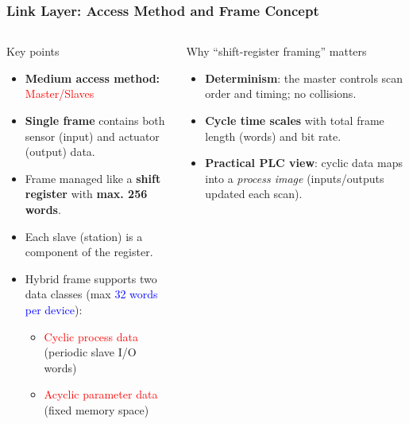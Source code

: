 \begin{frame}
	\frametitle{Link Layer: Access Method and Frame Concept}
	\small
	\begin{columns}
			\begin{block}{Key points}
				\begin{itemize}
					\item \textbf{Medium access method:} \textcolor{red}{Master/Slaves}
					\item \textbf{Single frame} contains both sensor (input) and actuator (output) data.
					\item Frame managed like a \textbf{shift register} with \textbf{max. 256 words}.
					\item Each slave (station) is a component of the register.
					\item Hybrid frame supports two data classes (max \textcolor{blue}{32 words per device}):
					\begin{itemize}
						\item \textcolor{red}{Cyclic process data} (periodic slave I/O words)
						\item \textcolor{red}{Acyclic parameter data} (fixed memory space)
					\end{itemize}
				\end{itemize}
			\end{block}
			\begin{block}{Why ``shift-register framing'' matters}
				\begin{itemize}
					\item \textbf{Determinism}: the master controls scan order and timing; no collisions.
					\item \textbf{Cycle time scales} with total frame length (words) and bit rate.
					\item \textbf{Practical PLC view}: cyclic data maps into a \emph{process image} (inputs/outputs updated each scan).
				\end{itemize}
			\end{block}
	\end{columns}
\end{frame}


